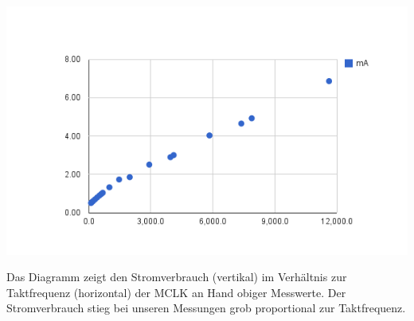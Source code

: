 \includegraphics[width=\textwidth]{aufgaben/06/chart_2.png}

Das Diagramm zeigt den Stromverbrauch (vertikal) im Verhältnis zur Taktfrequenz (horizontal) der MCLK an Hand obiger Messwerte. Der Stromverbrauch stieg bei unseren Messungen grob proportional zur Taktfrequenz.

